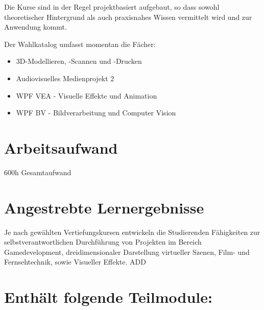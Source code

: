 Die Kurse sind in der Regel projektbasiert aufgebaut, so dass sowohl
theoretischer Hintergrund als auch praxisnahes Wissen vermittelt wird
und zur Anwendung kommt.

Der Wahlkatalog umfasst momentan die Fächer:

\begin{itemize}
\tightlist
\item
  3D-Modellieren, -Scannen und -Drucken
\item
  Audiovisuelles Medienprojekt 2
\item
  WPF VEA - Visuelle Effekte und Animation
\item
  WPF BV - Bildverarbeitung und Computer Vision
\end{itemize}

\hypertarget{arbeitsaufwandpathlabelmi-2017modulbeschreibungen-bachelorba_vertiefung-visual-computing}{%
\section*{Arbeitsaufwand\label{/mi-2017/modulbeschreibungen-bachelor/BA_Vertiefung-Visual-Computing}}\label{arbeitsaufwandpathlabelmi-2017modulbeschreibungen-bachelorba_vertiefung-visual-computing}}

600h Gesamtaufwand

\hypertarget{angestrebte-lernergebnissepathlabelmi-2017modulbeschreibungen-bachelorba_vertiefung-visual-computing}{%
\section*{Angestrebte
Lernergebnisse\label{/mi-2017/modulbeschreibungen-bachelor/BA_Vertiefung-Visual-Computing}}\label{angestrebte-lernergebnissepathlabelmi-2017modulbeschreibungen-bachelorba_vertiefung-visual-computing}}

Je nach gewählten Vertiefungskursen entwickeln die Studierenden
Fähigkeiten zur selbstverantwortlichen Durchführung von Projekten im
Bereich Gamedevelopment, dreidimensionaler Darstellung virtueller
Szenen, Film- und Fernsehtechnik, sowie Visueller Effekte. ADD

\hypertarget{enthuxe4lt-folgende-teilmodulepathlabelmi-2017modulbeschreibungen-bachelorba_vertiefung-visual-computing}{%
\section*{Enthält folgende
Teilmodule:\label{/mi-2017/modulbeschreibungen-bachelor/BA_Vertiefung-Visual-Computing}}\label{enthuxe4lt-folgende-teilmodulepathlabelmi-2017modulbeschreibungen-bachelorba_vertiefung-visual-computing}}

